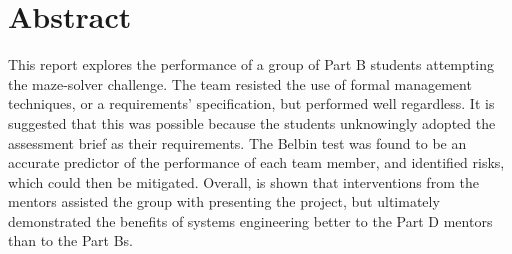

\section*{Abstract}
    This report explores the performance of a group of Part B students attempting the maze-solver challenge.
    The team resisted the use of formal management techniques, or a requirements' specification, but performed well regardless.
    It is suggested that this was possible because the students unknowingly adopted the assessment brief as their requirements.
    The Belbin test was found to be an accurate predictor of the performance of each team member, and identified risks, which could then be mitigated.
    Overall, is shown that interventions from the mentors assisted the group with presenting the project, but ultimately demonstrated the benefits of systems engineering better to the Part D mentors than to the Part Bs.
